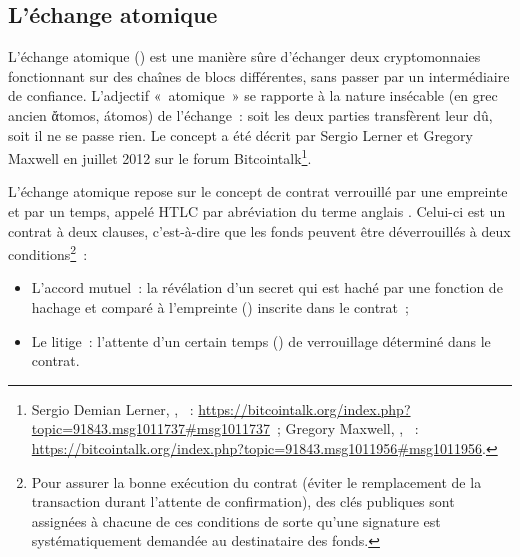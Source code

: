 
\subsection{L'échange atomique} L'échange atomique () est une manière sûre d'échanger deux cryptomonnaies fonctionnant sur des chaînes de blocs différentes, sans passer par un intermédiaire de confiance. L'adjectif «~atomique~» se rapporte à la nature insécable (en grec ancien \foreignlanguage{greek}{ἄtomos}, átomos) de l'échange~: soit les deux parties transfèrent leur dû, soit il ne se passe rien. Le concept a été décrit par Sergio Lerner et Gregory Maxwell en juillet 2012 sur le forum Bitcointalk\footnote{Sergio Demian Lerner, , ~: \url{https://bitcointalk.org/index.php?topic=91843.msg1011737\#msg1011737}~; Gregory Maxwell, , ~: \url{https://bitcointalk.org/index.php?topic=91843.msg1011956\#msg1011956}.}.

L'échange atomique repose sur le concept de contrat verrouillé par une empreinte et par un temps, appelé HTLC par abréviation du terme anglais . Celui-ci est un contrat à deux clauses, c'est-à-dire que les fonds peuvent être déverrouillés à deux conditions\footnote{Pour assurer la bonne exécution du contrat (éviter le remplacement de la transaction durant l'attente de confirmation), des clés publiques sont assignées à chacune de ces conditions de sorte qu'une signature est systématiquement demandée au destinataire des fonds.}~:

\begin{itemize}
\item L'accord mutuel~: la révélation d'un secret qui est haché par une fonction de hachage et comparé à l'empreinte () inscrite dans le contrat~;
\item Le litige~: l'attente d'un certain temps () de verrouillage déterminé dans le contrat.
\end{itemize}

%

